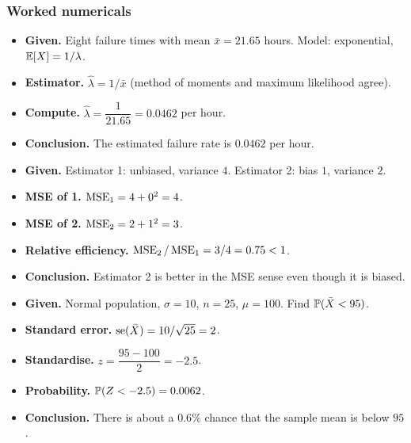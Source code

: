 \subsubsection*{Worked numericals}

\begin{example}
\begin{itemize}
  \item \textbf{Given.} Eight failure times with mean $\bar{x}=21.65$ hours. Model: exponential, $\mathbb{E}[X]=1/\lambda$.
  \item \textbf{Estimator.} $\hat\lambda=1/\bar{x}$ (method of moments and maximum likelihood agree).
  \item \textbf{Compute.} $\hat\lambda=\dfrac{1}{21.65}=0.0462$ per hour.
  \item \textbf{Conclusion.} The estimated failure rate is $0.0462$ per hour.
\end{itemize}
\end{example}

\begin{example}
\begin{itemize}
  \item \textbf{Given.} Estimator 1: unbiased, variance $4$. Estimator 2: bias $1$, variance $2$.
  \item \textbf{MSE of 1.} $\operatorname{MSE}_1=4+0^2=4$.
  \item \textbf{MSE of 2.} $\operatorname{MSE}_2=2+1^2=3$.
  \item \textbf{Relative efficiency.} $\operatorname{MSE}_2/\operatorname{MSE}_1=3/4=0.75<1$.
  \item \textbf{Conclusion.} Estimator 2 is better in the MSE sense even though it is biased.
\end{itemize}
\end{example}

\begin{example}
\begin{itemize}
  \item \textbf{Given.} Normal population, $\sigma=10$, $n=25$, $\mu=100$. Find $\mathbb{P}(\bar{X}<95)$.
  \item \textbf{Standard error.} $\operatorname{se}(\bar{X})=10/\sqrt{25}=2$.
  \item \textbf{Standardise.} $z=\dfrac{95-100}{2}=-2.5$.
  \item \textbf{Probability.} $\mathbb{P}(Z<-2.5)=0.0062$.
  \item \textbf{Conclusion.} There is about a $0.6\%$ chance that the sample mean is below $95$.
\end{itemize}
\end{example}

